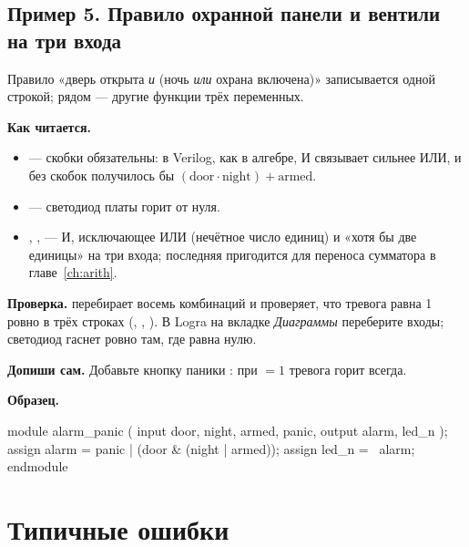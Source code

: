 \subsection{Пример 5. Правило охранной панели и вентили на три входа}

Правило «дверь открыта \emph{и} (ночь \emph{или} охрана включена)» записывается
одной строкой; рядом --- другие функции трёх переменных.


\textbf{Как читается.}
\begin{itemize}
  \item {} --- скобки обязательны: в Verilog, как в алгебре, И связывает сильнее ИЛИ, и без скобок получилось бы $(\text{door}\cdot\text{night}) + \text{armed}$.
  \item {} --- светодиод платы горит от нуля.
  \item {}, ,  --- И, исключающее ИЛИ (нечётное число единиц) и «хотя бы две единицы» на три входа; последняя пригодится для переноса сумматора в главе~\ref{ch:arith}.
\end{itemize}
\textbf{Проверка.}  перебирает восемь комбинаций и
проверяет, что тревога равна 1 ровно в трёх строках (, ,
). В Logra на вкладке \emph{Диаграммы} переберите входы; светодиод
 гаснет ровно там, где  равна нулю.

\textbf{Допиши сам.} Добавьте кнопку паники : при 
$=1$ тревога горит всегда.

\textbf{Образец.}\par\nopagebreak
\begin{vcode}
module alarm_panic (
    input  door, night, armed, panic,
    output alarm, led_n
);
    assign alarm = panic | (door & (night | armed));
    assign led_n = ~alarm;
endmodule
\end{vcode}

\section{Типичные ошибки}

